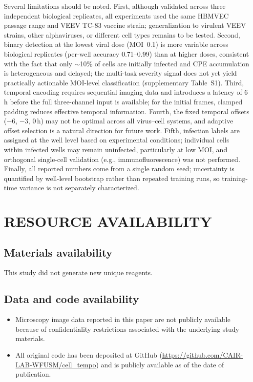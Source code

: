 \documentclass[12pt,letterpaper]{article}
\begin{document}
Several limitations should be noted.
First, although validated across three independent biological replicates, all experiments used the same HBMVEC passage range and VEEV TC-83 vaccine strain; generalization to virulent VEEV strains, other alphaviruses, or different cell types remains to be tested.
Second, binary detection at the lowest viral dose (MOI~0.1) is more variable across biological replicates (per-well accuracy 0.71--0.99) than at higher doses, consistent with the fact that only $\sim$10\% of cells are initially infected and CPE accumulation is heterogeneous and delayed; the multi-task severity signal does not yet yield practically actionable MOI-level classification (supplementary Table~S1).
Third, temporal encoding requires sequential imaging data and introduces a latency of 6\,h before the full three-channel input is available; for the initial frames, clamped padding reduces effective temporal information.
Fourth, the fixed temporal offsets ($-$6, $-$3, 0\,h) may not be optimal across all virus--cell systems, and adaptive offset selection is a natural direction for future work.
Fifth, infection labels are assigned at the well level based on experimental conditions; individual cells within infected wells may remain uninfected, particularly at low MOI, and orthogonal single-cell validation (e.g., immunofluorescence) was not performed.
Finally, all reported numbers come from a single random seed; uncertainty is quantified by well-level bootstrap rather than repeated training runs, so training-time variance is not separately characterized.

\section*{RESOURCE AVAILABILITY}

\subsection*{Materials availability}

This study did not generate new unique reagents.

\subsection*{Data and code availability}

\begin{itemize}
  \item Microscopy image data reported in this paper are not publicly available because of confidentiality restrictions associated with the underlying study materials.
  \item All original code has been deposited at GitHub (\url{https://github.com/CAIR-LAB-WFUSM/cell_tempo}) and is publicly available as of the date of publication.
\end{itemize}
\end{document}
